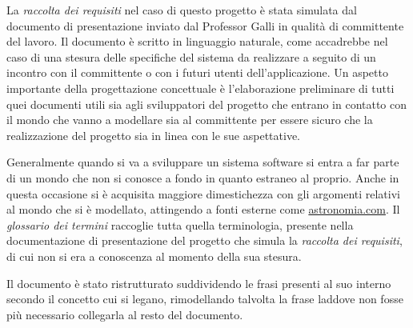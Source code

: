\documentclass[12pt,a4paper,onecolumn]{article}
\begin{document}
	La \textit{raccolta dei requisiti} nel caso di questo progetto è stata simulata dal documento di presentazione inviato dal Professor Galli in qualità di committente del lavoro. Il documento è scritto in linguaggio naturale, come accadrebbe nel caso di una stesura delle  specifiche del sistema da realizzare a seguito di un incontro con il committente o con i futuri utenti dell'applicazione.
	Un aspetto importante della progettazione concettuale è l'elaborazione preliminare di tutti quei documenti utili sia agli sviluppatori del progetto che entrano in contatto con il mondo che vanno a modellare sia al committente per essere sicuro che la realizzazione del progetto sia in linea con le sue aspettative. 
	\newline

	Generalmente quando si va a sviluppare un sistema software si entra a far parte di un mondo che non si conosce a fondo in quanto estraneo al proprio. Anche in questa occasione si è acquisita maggiore dimestichezza con gli argomenti relativi al mondo che si è modellato, attingendo a fonti esterne come \textsf{\href{http://www.astronomia.com}{astronomia.com}}. Il \textit{glossario dei termini} raccoglie tutta quella terminologia, presente nella documentazione di presentazione del progetto che simula la \textit{raccolta dei requisiti}, di cui non si era a conoscenza al momento della sua stesura.\newline
	
	Il documento è stato ristrutturato suddividendo le frasi presenti al suo interno secondo il concetto cui si legano, rimodellando talvolta la frase laddove non fosse più necessario collegarla al resto del documento.
\end{document}

